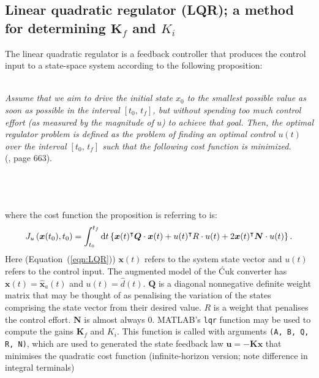 \subsection{Linear quadratic regulator (LQR); a method for determining $\boldsymbol{K}_f$ and $K_i$}\label{sec:LQR}
The linear quadratic regulator is a feedback controller that produces the control input to a state-space system according to the following proposition:
~\\~\\
\hspace*{\fill}
\begin{minipage}[t]{0.8\textwidth}
\textit{
Assume that we aim to drive the initial state $x_0$ to the smallest possible value as soon as possible in the interval $[t_0, \, t_f]$, but without spending too much control effort (as measured by the magnitude of $u$) to achieve that goal. Then, the optimal regulator problem is defined as the problem of finding an optimal control $u(t)$ over
the interval $[t_0, \, t_f]$ such that the following cost function is minimized.
}\\
(\cite{controlsystemdesign}, page 663).
\end{minipage}
\hspace*{\fill}
~\\~\\~\\
where the cost function the proposition is referring to is:
\begin{align}
J_u \left(\boldsymbol{x}(t_0), t_0\right) = \int_{t_0}^{t_f} \mathrm{d}t\left\{\boldsymbol{x}(t)^\intercal \boldsymbol{Q} \cdot \boldsymbol{x}(t)
+ u(t)^\intercal R \cdot u(t)
+ 2 \boldsymbol{x}(t)^\intercal \boldsymbol{N} \cdot u(t)\right\}.
\label{eqn:LQR}
\end{align}
%
Here (Equation~(\ref{eqn:LQR})) $\boldsymbol{x}(t)$ refers to the system state vector and $u(t)$ refers to the control input. The augmented model of the \'Cuk converter has $\boldsymbol{x}(t) = \hat{\boldsymbol{x}}_a(t)$ and $u(t) = \hat{d}(t)$. $\boldsymbol{Q}$ is a diagonal nonnegative definite weight matrix that may be thought of as penalising the variation of the states comprising the state vector from their desired value. $R$ is a weight that penalises the control effort. $\boldsymbol{N}$ is almost always 0.
\newpar
\textsf{MATLAB}'s \texttt{lqr} function may be used to compute the gains $\boldsymbol{K}_f$ and $K_i$. This function is called with arguments \texttt{(A, B, Q, R, N)}, which are used to generated the state feedback law $\boldsymbol{u} = -\boldsymbol{K}\boldsymbol{x}$ that minimises the quadratic cost function (infinite-horizon version; note difference in integral terminals)
